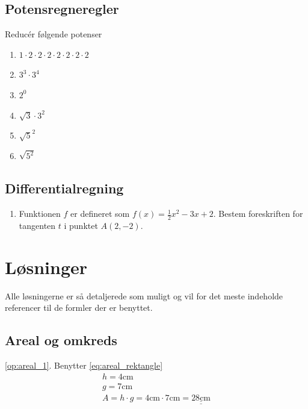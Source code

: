 \documentclass[11pt,a5paper,fleqn,leqno]{book}
\begin{document}
\section{Potensregneregler}

Reducér følgende potenser

\begin{enumerate}
\item \label{op:potens_1} $1 \cdot 2 \cdot 2 \cdot 2 \cdot 2 \cdot 2 \cdot 2 \cdot 2$
\item \label{op:potens_2} $3^3 \cdot 3^4$
\item \label{op:potens_3} $2^0$
\item \label{op:potens_4} $\sqrt{3} \cdot 3^2$
\item \label{op:potens_5} $\sqrt{5}^2$
\item \label{op:potens_6} $\sqrt{5^2}$
\end{enumerate}

\section{Differentialregning}

\begin{enumerate}
\item \label{op:diff_1} Funktionen $f$ er defineret som $f(x) = \frac{1}{2}x^2 - 3x + 2$. Bestem foreskriften for tangenten $t$ i punktet $A(2,-2)$.
\end{enumerate}

\chapter{Løsninger} \label{ch:Loesninger}

Alle løsningerne er så detaljerede som muligt og vil for det meste indeholde referencer til de formler der er benyttet.

\newpage

\section{Areal og omkreds}

\ref{op:areal_1}. Benytter \eqref{eq:areal_rektangle}
\begin{displaymath}\begin{array}{l}
h = 4\text{cm}\\
g = 7\text{cm}\\
A = h \cdot g = 4\text{cm} \cdot 7\text{cm} = \underline{\underline{28\text{cm}}}
\end{array}\end{displaymath}
\end{document}
